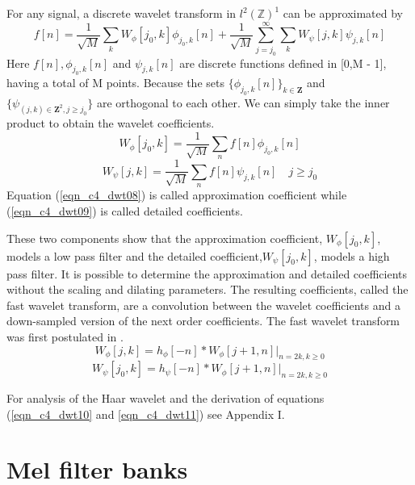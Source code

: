 For any signal, a discrete wavelet transform in $l^2(\mathbb{Z})^1$ can be approximated by
\begin{equation}
f[n]=\frac{1}{\sqrt{M}}\sum_kW_\phi[j_0,k]\phi_{j_0,k}[n]+\frac{1}{\sqrt{M}}\sum_{j=j_0}^\infty\sum_kW_\psi[j,k]\psi_{j,k}[n]
\label{eqn_c4_dwt07}
\end{equation}
Here $f[n],\phi_{j_0,k}[n]$ and $\psi_{j,k}[n]$ are discrete functions defined in [0,M - 1], having a total of M points.  Because the sets $\{\phi_{j_0,k}[n]\}_{k\in\mathbf{Z}}$ and $\{\psi_{(j,k)\in\mathbf{Z}^2,j\ge j_0}\}$ are orthogonal to each other.  We can simply take the inner product to obtain the wavelet coefficients.
\begin{equation}
W_\phi[j_0,k]=\frac{1}{\sqrt{M}}\sum_nf[n]\phi_{j_0,k}[n]
\label{eqn_c4_dwt08}
\end{equation}
\begin{equation}
W_\psi[j,k]=\frac{1}{\sqrt{M}}\sum_nf[n]\psi_{j,k}[n] \quad j\ge j_0
\label{eqn_c4_dwt09}
\end{equation}
Equation (\ref{eqn_c4_dwt08}) is called approximation coefficient while (\ref{eqn_c4_dwt09}) is called detailed coefficients.

These two components show that the approximation coefficient, $W_\phi[j_0,k]$, models a low pass filter and the detailed coefficient,$W_\psi[j_0,k]$, models a high pass filter. It is possible to determine the approximation and detailed coefficients without the scaling and dilating parameters. The resulting coefficients, called the fast wavelet transform, are a convolution between the wavelet coefficients and a down-sampled version of the next order coefficients.  The fast wavelet transform was first postulated in \citep{mallat1989theory}.
\begin{equation}
W_\phi[j,k]=h_\phi[-n]\ast W_\phi[j+1,n]|_{n=2k, k\ge 0}
\label{eqn_c4_dwt10}
\end{equation}
\begin{equation}
W_\psi[j_0,k]=h_\psi[-n]\ast W_\phi[j+1,n]|_{n=2k, k\ge 0}
\label{eqn_c4_dwt11}
\end{equation}

For analysis of the Haar wavelet and the derivation of equations (\ref{eqn_c4_dwt10} and \ref{eqn_c4_dwt11}) see Appendix I.

\section{Mel filter banks}

